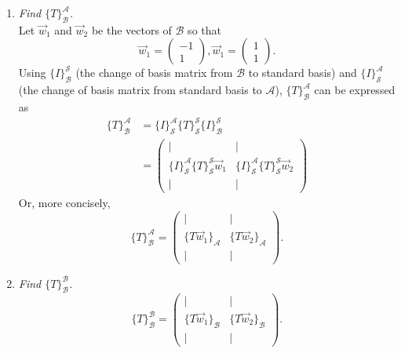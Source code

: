 \documentclass[12pt]{article}
\newcommand{\based}[3]{{\{#1\}}_{#2}^{#3}}
\begin{document}
\begin{enumerate}[label=(\alph*)]
	\item \textit{Find $\based{T}{\mathcal{B}}{\mathcal{A}}$.}
	\\[\baselineskip]
	Let $\vec{w}_1$ and $\vec{w}_2$ be the vectors of $\mathcal{B}$ so that
	\begin{equation*}
		\vec{w}_1 = \begin{pmatrix} -1 \\ 1 \end{pmatrix},
		\vec{w}_1 = \begin{pmatrix} 1 \\ 1 \end{pmatrix}.
	\end{equation*}
	Using $\based{I}{\mathcal{B}}{\mathcal{S}}$ (the change of basis matrix
	from $\mathcal{B}$ to standard basis) and
	$\based{I}{\mathcal{S}}{\mathcal{A}}$ (the change of basis matrix from
	standard basis to $\mathcal{A}$), $\based{T}{\mathcal{B}}{\mathcal{A}}$
	can be expressed as
	\begin{align*}
		\based{T}{\mathcal{B}}{\mathcal{A}}
		&=
		\based{I}{\mathcal{S}}{\mathcal{A}}
		\based{T}{\mathcal{S}}{\mathcal{S}}
		\based{I}{\mathcal{B}}{\mathcal{S}}
		\\
		&=
		\begin{pmatrix}
			\vert & \vert \\
			\based{I}{\mathcal{S}}{\mathcal{A}}
			\based{T}{\mathcal{S}}{\mathcal{S}}
			\vec{w}_1 &
			\based{I}{\mathcal{S}}{\mathcal{A}}
			\based{T}{\mathcal{S}}{\mathcal{S}}
			\vec{w}_2 \\
			\vert & \vert
		\end{pmatrix}
	\end{align*}
	Or, more concisely,
	\begin{equation*}
		\based{T}{\mathcal{B}}{\mathcal{A}}
		=
		\begin{pmatrix}
			\vert & \vert \\
			{\{T \vec{w}_1\}}_{\mathcal{A}} &
			{\{T \vec{w}_2\}}_{\mathcal{A}} \\
			\vert & \vert
		\end{pmatrix}
		.
	\end{equation*}
	
	\item \textit{Find $\based{T}{\mathcal{B}}{\mathcal{B}}$.}
	\begin{equation*}
		\based{T}{\mathcal{B}}{\mathcal{B}}
		=
		\begin{pmatrix}
			\vert & \vert \\
			{\{T \vec{w}_1\}}_{\mathcal{B}} &
			{\{T \vec{w}_2\}}_{\mathcal{B}} \\
			\vert & \vert
		\end{pmatrix}
		.
	\end{equation*}
\end{enumerate}
\end{document}
